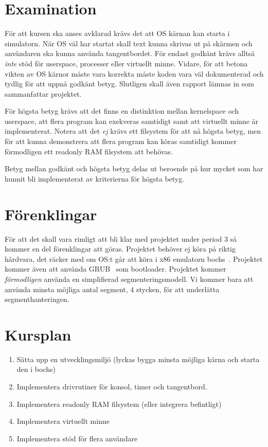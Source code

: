 \documentclass[11pt,oneside,a4paper]{article}
\begin{document}
\section{Examination}
För att kursen ska anses avklarad krävs det att OS kärnan kan starta i
simulatorn. När OS väl har startat skall text kunna skrivas ut på
skärmen och användaren ska kunna använda tangentbordet. För endast godkänt
krävs alltså \emph{inte} stöd för userspace, processer eller virtuellt minne.
Vidare, för att betona vikten av OS kärnor måste vara korrekta måste koden vara
väl dokumenterad och tydlig för att uppnå godkänt betyg.
Slutligen skall även rapport lämnas in som sammanfattar projektet.

För högsta betyg krävs att det finns en distinktion mellan kernelspace och
userspace, att flera program kan exekveras samtidigt samt att virtuellt minne är
implementerat. Notera att det \emph{ej} krävs ett filsystem för att nå högsta
betyg, men för att kunna demonstrera att flera program kan köras samtidigt
kommer förmodligen ett readonly RAM filsystem att behövas.

Betyg mellan godkänt och högsta betyg delas ut beroende på hur mycket som har
hunnit bli implementerat av kriterierna för högsta betyg.

\section{Förenklingar}
För att det skall vara rimligt att bli klar med projektet under period 3 så
kommer en del förenklingar att göras.
Projektet behöver ej köra på riktig hårdvara, det räcker med om OS:t går att
köra i x86 emulatorn bochs~\cite{bochs}. Projektet kommer även att använda
GRUB~\cite{grub} som bootloader. Projektet kommer \emph{förmodligen} använda en
simplifierad segmenteringsmodell. Vi kommer bara att använda minsta möjliga
antal segment, 4 stycken, för att underlätta segmenthanteringen.

\section{Kursplan}
\begin{enumerate}
    \item Sätta upp en utvecklingsmiljö (lyckas bygga minsta möjliga kärna och
    starta den i bochs)
    \item Implementera drivrutiner för konsol, timer och tangentbord.
    \item Implementera readonly RAM filsystem (eller integrera befintligt)
    \item Implementera virtuellt minne
    \item Implementera stöd för flera användare
\end{enumerate}
\end{document}
